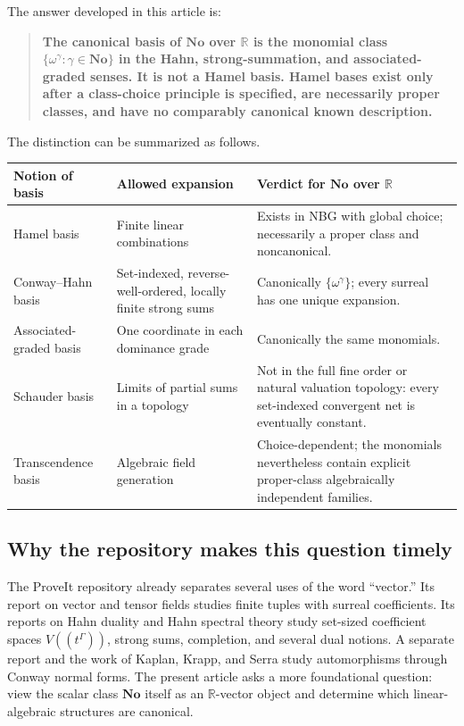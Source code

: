 \documentclass[11pt,letterpaper]{article}
\numberwithin{equation}{section}
\theoremstyle{definition}
\theoremstyle{remark}
\newcommand{\No}{\mathbf{No}}
\newcommand{\R}{\mathbb{R}}
\begin{document}
The answer developed in this article is:
\begin{quote}
\textbf{The canonical basis of \(\No\) over \(\R\) is the monomial class
\(\{\omega^\gamma:\gamma\in\No\}\) in the Hahn, strong-summation, and
associated-graded senses.  It is not a Hamel basis.  Hamel bases exist only
after a class-choice principle is specified, are necessarily proper classes,
and have no comparably canonical known description.}
\end{quote}

The distinction can be summarized as follows.

\begin{center}
\small
\begin{tabularx}{0.96\textwidth}{L{0.20\textwidth}Y Y}
\toprule
Notion of basis & Allowed expansion & Verdict for \(\No\) over \(\R\)\\
\midrule
Hamel basis & Finite linear combinations & Exists in NBG with global choice;
necessarily a proper class and noncanonical.\\
Conway--Hahn basis & Set-indexed, reverse-well-ordered, locally finite strong
sums & Canonically \(\{\omega^\gamma\}\); every surreal has one unique
expansion.\\
Associated-graded basis & One coordinate in each dominance grade &
Canonically the same monomials.\\
Schauder basis & Limits of partial sums in a topology & Not in the full fine
order or natural valuation topology: every set-indexed convergent net is
eventually constant.\\
Transcendence basis & Algebraic field generation & Choice-dependent; the
monomials nevertheless contain explicit proper-class algebraically
independent families.\\
\bottomrule
\end{tabularx}
\end{center}

\subsection{Why the repository makes this question timely}

The ProveIt repository already separates several uses of the word ``vector.''
Its report on vector and tensor fields studies finite tuples with surreal
coefficients.  Its reports on Hahn duality and Hahn spectral theory study
set-sized coefficient spaces \(V((t^\Gamma))\), strong sums, completion, and
several dual notions.  A separate report and the work of Kaplan, Krapp, and
Serra study automorphisms through Conway normal forms.  The present article
asks a more foundational question: view the scalar class \(\No\) itself as
an \(\R\)-vector object and determine which linear-algebraic structures are
canonical.
\end{document}
